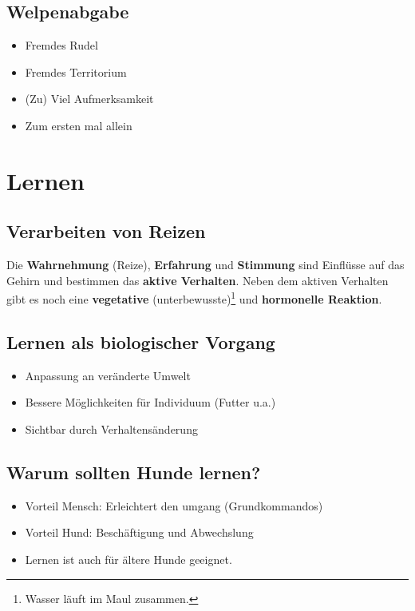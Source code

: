     \subsection{Welpenabgabe}
        \begin{itemize}
            \item Fremdes \glqq Rudel\grqq{}
            \item Fremdes Territorium
            \item (Zu) Viel Aufmerksamkeit
            \item Zum ersten mal allein
        \end{itemize}


\section{Lernen}

    \subsection{Verarbeiten von Reizen}
        Die \textbf{Wahrnehmung} (Reize), \textbf{Erfahrung} und \textbf{Stimmung} sind Einflüsse auf das Gehirn und bestimmen das \textbf{aktive Verhalten}.
        Neben dem aktiven Verhalten gibt es noch eine \textbf{vegetative} (unterbewusste)\footnote{Wasser läuft im Maul zusammen.} und \textbf{hormonelle Reaktion}.

    \subsection{Lernen als biologischer Vorgang}
        \begin{itemize}
            \item Anpassung an veränderte Umwelt
            \item Bessere Möglichkeiten für Individuum (Futter u.a.)
            \item Sichtbar durch Verhaltensänderung
        \end{itemize}

    \subsection{Warum sollten Hunde lernen?}
        \begin{itemize}
            \item Vorteil Mensch: Erleichtert den umgang (Grundkommandos)
            \item Vorteil Hund: Beschäftigung und Abwechslung
            \item Lernen ist auch für ältere Hunde geeignet.
        \end{itemize}

